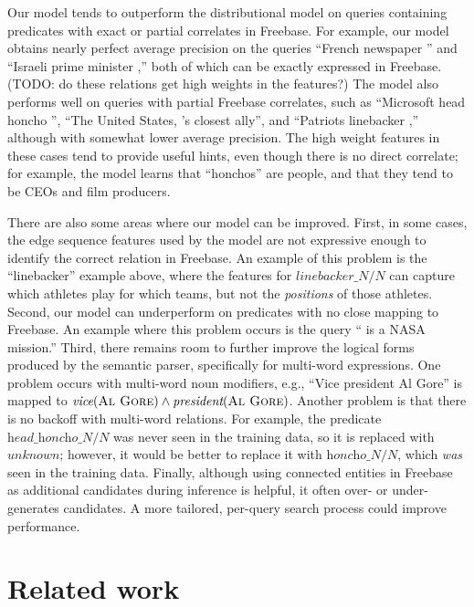 \documentclass[11pt]{article}
\newcommand{\blank}{\underline{\hspace{.5cm}}}
\newcommand{\lexicalpredicate}[1]{\ensuremath{\textit{#1}}}
\newcommand{\entity}[1]{\ensuremath{\textsc{#1}}}
\begin{document}
Our model tends to outperform the distributional model on queries
containing predicates with exact or partial correlates in
Freebase. For example, our model obtains nearly perfect average
precision on the queries ``French newspaper \blank{}'' and ``Israeli
prime minister \blank{},'' both of which can be exactly expressed in
Freebase. (TODO: do these relations get high weights in the features?)
The model also performs well on queries with partial Freebase
correlates, such as ``Microsoft head honcho \blank{}'', ``The United
States, \blank{}'s closest ally'', and ``Patriots linebacker
\blank{},'' although with somewhat lower average precision. The high
weight features in these cases tend to provide useful hints, even
though there is no direct correlate; for example, the model learns
that ``honchos'' are people, and that they tend to be CEOs and film
producers.

There are also some areas where our model can be improved. First, in
some cases, the edge sequence features used by the model are not
expressive enough to identify the correct relation in Freebase. An
example of this problem is the ``linebacker'' example above, where the
features for \lexicalpredicate{linebacker\_N/N} can capture which athletes
play for which teams, but not the \emph{positions} of those
athletes. Second, our model can underperform on predicates with no
close mapping to Freebase. An example where this problem occurs is the
query ``\blank{} is a NASA mission.'' Third, there remains room to
further improve the logical forms produced by the semantic parser,
specifically for multi-word expressions. One problem occurs with
multi-word noun modifiers, e.g., ``Vice president Al Gore'' is mapped
to $\lexicalpredicate{vice}(\entity{Al Gore}) \land
\lexicalpredicate{president}(\entity{Al Gore})$. Another problem is that
there is no backoff with multi-word relations. For example, the
predicate \lexicalpredicate{head\_honcho\_N/N} was never seen in the training
data, so it is replaced with \lexicalpredicate{unknown}; however, it would be
better to replace it with \lexicalpredicate{honcho\_N/N}, which \emph{was}
seen in the training data. Finally, although using connected entities
in Freebase as additional candidates during inference is helpful, it
often over- or under-generates candidates. A more tailored, per-query
search process could improve performance.

\section{Related work}
\end{document}
